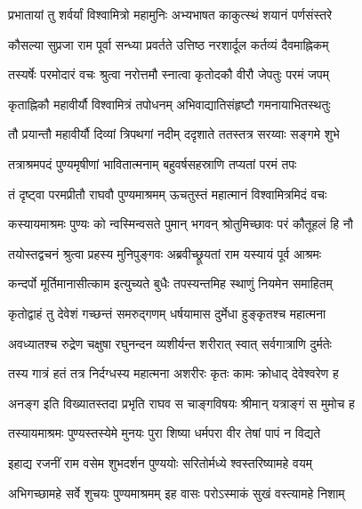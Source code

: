 
\twolineshloka
{प्रभातायां तु शर्वर्यां विश्वामित्रो महामुनिः}
{अभ्यभाषत काकुत्स्थं शयानं पर्णसंस्तरे} %

\twolineshloka
{कौसल्या सुप्रजा राम पूर्वा सन्ध्या प्रवर्तते}
{उत्तिष्ठ नरशार्दूल कर्तव्यं दैवमाह्निकम्} %

\twolineshloka
{तस्यर्षेः परमोदारं वचः श्रुत्वा नरोत्तमौ}
{स्नात्वा कृतोदकौ वीरौ जेपतुः परमं जपम्} %

\twolineshloka
{कृताह्निकौ महावीर्यौ विश्वामित्रं तपोधनम्}
{अभिवाद्यातिसंहृष्टौ गमनायाभितस्थतुः} %

\twolineshloka
{तौ प्रयान्तौ महावीर्यौ दिव्यां त्रिपथगां नदीम्}
{ददृशाते ततस्तत्र सरय्वाः सङ्गमे शुभे} %

\twolineshloka
{तत्राश्रमपदं पुण्यमृषीणां भावितात्मनाम्}
{बहुवर्षसहस्राणि तप्यतां परमं तपः} %

\twolineshloka
{तं दृष्ट्वा परमप्रीतौ राघवौ पुण्यमाश्रमम्}
{ऊचतुस्तं महात्मानं विश्वामित्रमिदं वचः} %

\twolineshloka
{कस्यायमाश्रमः पुण्यः को न्वस्मिन्वसते पुमान्}
{भगवन् श्रोतुमिच्छावः परं कौतूहलं हि नौ} %

\twolineshloka
{तयोस्तद्वचनं श्रुत्वा प्रहस्य मुनिपुङ्गवः}
{अब्रवीच्छ्रूयतां राम यस्यायं पूर्व आश्रमः} %

\twolineshloka
{कन्दर्पो मूर्तिमानासीत्काम इत्युच्यते बुधैः}
{तपस्यन्तमिह स्थाणुं नियमेन समाहितम्} %

\twolineshloka
{कृतोद्वाहं तु देवेशं गच्छन्तं समरुद्गणम्}
{धर्षयामास दुर्मेधा हुङ्कृतश्च महात्मना} %

\twolineshloka
{अवध्यातश्च रुद्रेण चक्षुषा रघुनन्दन}
{व्यशीर्यन्त शरीरात् स्वात् सर्वगात्राणि दुर्मतेः} %

\twolineshloka
{तस्य गात्रं हतं तत्र निर्दग्धस्य महात्मना}
{अशरीरः कृतः कामः क्रोधाद् देवेश्वरेण ह} %

\twolineshloka
{अनङ्ग इति विख्यातस्तदा प्रभृति राघव}
{स चाङ्गविषयः श्रीमान् यत्राङ्गं स मुमोच ह} %

\twolineshloka
{तस्यायमाश्रमः पुण्यस्तस्येमे मुनयः पुरा}
{शिष्या धर्मपरा वीर तेषां पापं न विद्यते} %

\twolineshloka
{इहाद्य रजनीं राम वसेम शुभदर्शन}
{पुण्ययोः सरितोर्मध्ये श्वस्तरिष्यामहे वयम्} %

\twolineshloka
{अभिगच्छामहे सर्वे शुचयः पुण्यमाश्रमम्}
{इह वासः परोऽस्माकं सुखं वस्त्यामहे निशाम्} %

